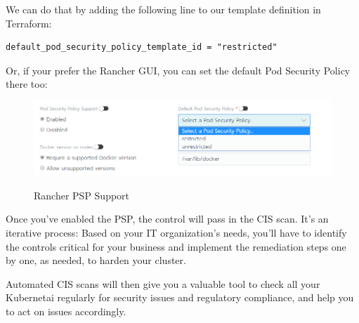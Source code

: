 We can do that by adding the following line to our template definition in Terraform:

\begin{lstlisting}[caption=Cluster Template with PSP, frame=single, basicstyle=\ttfamily]
default_pod_security_policy_template_id = "restricted"
\end{lstlisting}

Or, if your prefer the Rancher GUI, you can set the default Pod Security Policy there too:

\begin{figure}[H]
\centering
\caption {Rancher PSP Support}
\includegraphics[width=\linewidth]{images/rancher-psp-support.png}
\label{fig:rancherPSP}
\end{figure}

Once you've enabled the PSP, the control will pass in the CIS scan. It's an iterative process: Based on your IT organization's needs, you'll have to identify the controls critical for your business and implement the remediation steps one by one, as needed, to harden your cluster.

Automated CIS scans will then give you a valuable tool to check all your Kubernetai regularly for security issues and regulatory compliance, and help you to act on issues accordingly.
